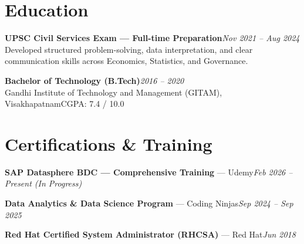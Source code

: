 \documentclass[10pt, letterpaper]{article}
\begin{document}
\section{Education}

{\bfseries UPSC Civil Services Exam — Full-time Preparation}\hfill{\small\color{muted}\textit{Nov 2021 – Aug 2024}}\\
{\small\color{muted}Developed structured problem-solving, data interpretation, and clear communication skills across Economics, Statistics, and Governance.}

\vspace{2pt}
{\bfseries Bachelor of Technology (B.Tech)}\hfill{\small\color{muted}\textit{2016 – 2020}}\\
{\small\color{muted}Gandhi Institute of Technology and Management (GITAM), Visakhapatnam\hfill CGPA: 7.4 / 10.0}

\section{Certifications \& Training}

{\bfseries SAP Datasphere BDC — Comprehensive Training} — Udemy\hfill{\small\color{muted}\textit{Feb 2026 – Present \emph{(In Progress)}}}

\vspace{1pt}
{\bfseries Data Analytics \& Data Science Program} — Coding Ninjas\hfill{\small\color{muted}\textit{Sep 2024 – Sep 2025}}

\vspace{1pt}
{\bfseries Red Hat Certified System Administrator (RHCSA)} — Red Hat\hfill{\small\color{muted}\textit{Jun 2018}}

\end{document}

